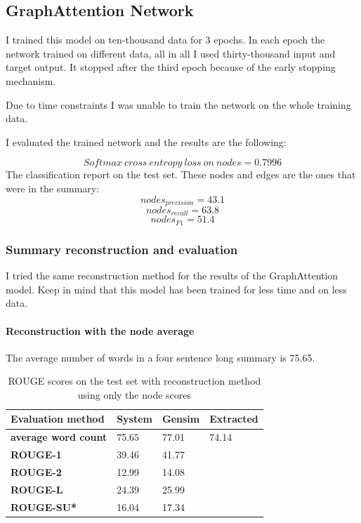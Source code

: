 \subsection{GraphAttention Network}

I trained this model on ten-thousand data for 3 epochs. In each epoch the network trained on different data, all in all I used thirty-thousand input and target output. It stopped after the third epoch because of the early stopping mechanism.

Due to time constraints I was unable to train the network on the whole training data.

I evaluated the trained network and the results are the following:

\[Softmax\ cross\ entropy\ loss\ on\ nodes = 0.7996\]
The classification report on the test set. These nodes and edges are the ones that were in the summary:
\[nodes_{precision} = 43.1\]
\[nodes_{recall} = 63.8\]
\[nodes_{F1} = 51.4\]

\subsubsection{Summary reconstruction and evaluation}
I tried the same reconstruction method for the results of the GraphAttention model. Keep in mind that this model has been trained for less time and on less data.

\paragraph{Reconstruction with the node average}

The average number of words in a four sentence long summary is 75.65.

\begin{table}[!ht]
	\centering
	\begin{tabular}{| l | l | l | l |}
	\hline
	\textbf{Evaluation method}&\textbf{System}&\textbf{Gensim}&\textbf{Extracted}\\ \hline \hline
	\textbf{average word count}&75.65&77.01&74.14 \\ \hline
	\textbf{ROUGE-1}&39.46&41.77& \\ \hline
	\textbf{ROUGE-2}&12.99&14.08& \\ \hline
	\textbf{ROUGE-L}&24.39&25.99& \\ \hline
	\textbf{ROUGE-SU*}&16.04&17.34& \\ \hline
	\end{tabular}
	\caption{ROUGE scores on the test set with reconstruction method using only the node scores}
\end{table}

